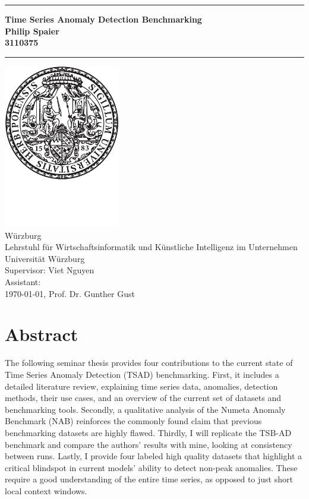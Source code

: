 \documentclass[12pt,oneside]{article}
\newcommand{\JMUTitle}[9]{

  \thispagestyle{empty}
  \vspace*{\stretch{1}}
  {\parindent0cm
  \rule{\linewidth}{.7ex}
  }
  \begin{flushright}
    \sffamily\bfseries\Huge
    #1\\
    \vspace*{\stretch{1}}
    \sffamily\bfseries\large
    #2\\
    \vspace*{\stretch{1}}
    \sffamily\bfseries\small
    #3
  \end{flushright}
  \rule{\linewidth}{.7ex}

  \vspace*{\stretch{1}}
  \begin{center}
    \includegraphics[width=2in]{siegel} \\
    \vspace*{\stretch{1}}
    \Large #5 \\

    \vspace*{\stretch{2}}
    \large Lehrstuhl f\"{u}r Wirtschaftsinformatik und Künstliche Intelligenz im Unternehmen \\
    \large Universität Würzburg\\
    \vspace*{\stretch{1}}
    \large Supervisor:  #8 \\[1mm]
    \large Assistant:  #9 \\[1mm]
    \vspace*{\stretch{1}}
    \large #6, #7
  \end{center}
}
\begin{document}
  \JMUTitle
      {Time Series Anomaly Detection Benchmarking}        %
      {Philip Spaier}                        %
      {3110375}
      
      {Seminar Thesis } %
      {Würzburg}                           %
      {\today}                          %
      {Prof. Dr. Gunther Gust}           %
      {Viet Nguyen} %
      
  \clearpage

\lhead{}
    \setcounter{page}{1}

\tableofcontents
\clearpage

\listoffigures

\listoftables
\clearpage

\setlength{\parskip}{0.5em} 


\section*{Abstract}

The following seminar thesis provides four contributions to the current state of Time Series Anomaly Detection (TSAD) benchmarking. First, it includes a detailed literature review, explaining time series data, anomalies, detection methods, their use cases, and an overview of the current set of datasets and benchmarking tools. Secondly, a qualitative analysis of the Numeta Anomaly Benchmark (NAB) reinforces the commonly found claim that previous benchmarking datasets are highly flawed. Thirdly, I will replicate the TSB-AD benchmark and compare the authors' results with mine, looking at consistency between runs. Lastly, I provide four labeled high quality datasets that highlight a critical blindspot in current models' ability to detect non-peak anomalies. These require a good understanding of the entire time series, as opposed to just short local context windows.


\clearpage
{}  
    \setcounter{page}{1}
\lhead{\nouppercase{\leftmark}}

\end{document}
